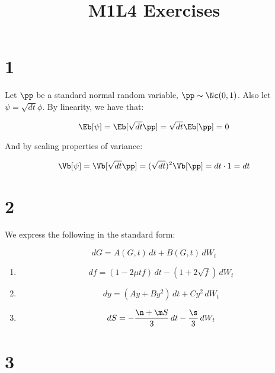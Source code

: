 \documentclass{article}
\begin{document}
	\title{M1L4 Exercises}
	\maketitle
	
	\section*{1}
	Let $\pp$ be a standard normal random variable, $\pp \sim \Nc(0,1)$. Also let $\psi = \sqrt{dt} \phi$. By linearity, we have that:
	
	\begin{equation*}
		\Eb[\psi] = \Eb[\sqrt{dt}\pp] = \sqrt{dt} \Eb[\pp] = 0
	\end{equation*}
	
	And by scaling properties of variance:
	
	\begin{equation*}
		\Vb[\psi] = \Vb[\sqrt{dt}\pp] = (\sqrt{dt})^2 \Vb[\pp] = dt \cdot 1 = dt
	\end{equation*}
	
	\section*{2}
	
	We express the following in the standard form:
	
	\begin{equation*}
		dG = A(G,t) \, dt + B(G,t) \, dW_t
	\end{equation*}
	
	\begin{enumerate}[label=\alph*.]
		\item		
		\begin{equation*}
			df = (1 - 2 \mu t f) \, dt - (1 + 2 \sqrt{f}) \, dW_t
		\end{equation*}
		
		\item		
		\begin{equation*}
			dy = (Ay + By^2) \, dt + Cy^2 \, dW_t
		\end{equation*}
		
		\item
		\begin{equation*}
			dS = -\frac{\n + \m S}{3} \, dt - \frac{\s}{3} \, dW_t
		\end{equation*}
	\end{enumerate}
	
	\section*{3}
	
\end{document}
